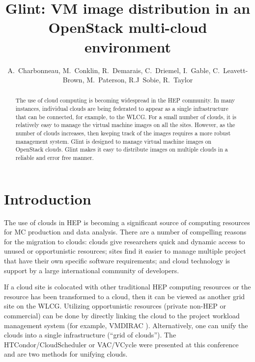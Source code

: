 \documentclass[a4paper]{jpconf}
\begin{document}
\linenumbers

\title{Glint: VM image distribution in an OpenStack multi-cloud environment}

\author{A.~Charbonneau, M.~Conklin, R.~Demarais, C.~Driemel, I.~Gable, C.~Leavett-Brown, 
M.~Paterson, R.J~Sobie, R.~Taylor}

\address{University of Victoria, Victoria, Canada}


\begin{abstract}
The use of cloud computing is becoming widespread in the HEP community. In many instances, individual clouds are being federated to appear as a single infrastructure that can be connected, for example, to the WLCG. For a small number of clouds, it is relatively easy to manage the virtual machine images on all the sites. However, as the number of clouds increases, then keeping track of the images requires a more robust management system. Glint is designed to manage virtual machine images on OpenStack clouds. Glint makes it easy to distribute images on multiple clouds in a reliable and error free manner. 
\end{abstract}

\section{Introduction}

The use of clouds in HEP is becoming a significant source of computing resources for MC production and data analysis.
There are a number of compelling reasons for the migration to clouds: clouds give researchers quick and dynamic access to unused or opportunistic resources;  sites find it easier to manage multiple project that have their own specific software requirements; and cloud technology is support by a large international community of developers.

If a cloud site is colocated with other traditional HEP computing resources or the resource has been transformed to a cloud, then it can be viewed as another grid site on the WLCG. Utilizing opportunistic resources (private non-HEP or commercial) can be done by directly linking the cloud to the project workload management system (for example, VMDIRAC \cite{vmdirac}). Alternatively, one can unify the clouds into a single infrastructure (``grid of clouds''). The HTCondor/CloudScheduler \cite{chep:gable-talk} or VAC/VCycle \cite{chep:vac-vcycle} were presented at this conference and are two methods for unifying clouds.
 
\end{document}
